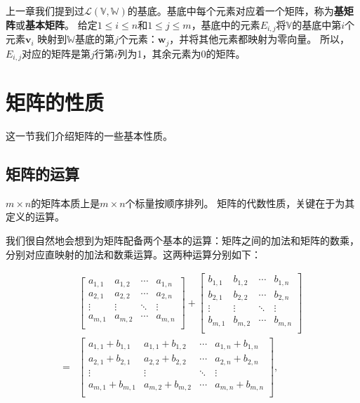 \documentclass[12pt,UTF8,fontset=none]{ctexbook}
\begin{document}
上一章我们提到过$\mathcal{L}(\mathbb{V}, \mathbb{W})$的基底。基底中每个元素对应着一个矩阵，称为\textbf{基矩阵}或\textbf{基本矩阵}。
给定$1\leq i \leq n$和$1\leq j \leq m$，基底中的元素$E_{i,j}$将$\mathbb{V}$的基底中第$i$个元素$\mathbf{v}_i$
映射到$\mathbb{W}$基底的第$j$个元素：$\mathbf{w}_j$，并将其他元素都映射为零向量。
所以，$E_{i,j}$对应的矩阵是第$j$行第$i$列为1，其余元素为0的矩阵。

\section{矩阵的性质}

这一节我们介绍矩阵的一些基本性质。

\subsection{矩阵的运算}
$m\times n$的矩阵本质上是$m\times n$个标量按顺序排列。
矩阵的代数性质，关键在于为其定义的运算。

我们很自然地会想到为矩阵配备两个基本的运算：矩阵之间的加法和矩阵的数乘，分别对应直映射的加法和数乘运算。这两种运算分别如下：

\begin{align*}
&\begin{bmatrix}
 a_{1,1}     & a_{1,2}   & \cdots & a_{1,n} \\
 a_{2,1}     & a_{2,2}   & \cdots & a_{2,n} \\
 \vdots      & \vdots    & \ddots & \vdots  \\
 a_{m,1}     & a_{m,2}   & \cdots & a_{m,n} \\
\end{bmatrix}
+
\begin{bmatrix}
    b_{1,1}     & b_{1,2}   & \cdots & b_{1,n} \\
    b_{2,1}     & b_{2,2}   & \cdots & b_{2,n} \\
    \vdots      & \vdots    & \ddots & \vdots  \\
    b_{m,1}     & b_{m,2}   & \cdots & b_{m,n} \\
\end{bmatrix}  \\
=&
\begin{bmatrix}
    a_{1,1} + b_{1,1}     & a_{1,1} + b_{1,2}   & \cdots & a_{1,n} + b_{1,n} \\
    a_{2,1} + b_{2,1}     & a_{2,2} + b_{2,2}   & \cdots & a_{2,n} + b_{2,n} \\
    \vdots                & \vdots              & \ddots &           \vdots  \\
    a_{m,1} + b_{m,1}     & a_{m,2} + b_{m,2}   & \cdots & a_{m,n} + b_{m,n} \\
\end{bmatrix} ,
\end{align*}
\end{document}
